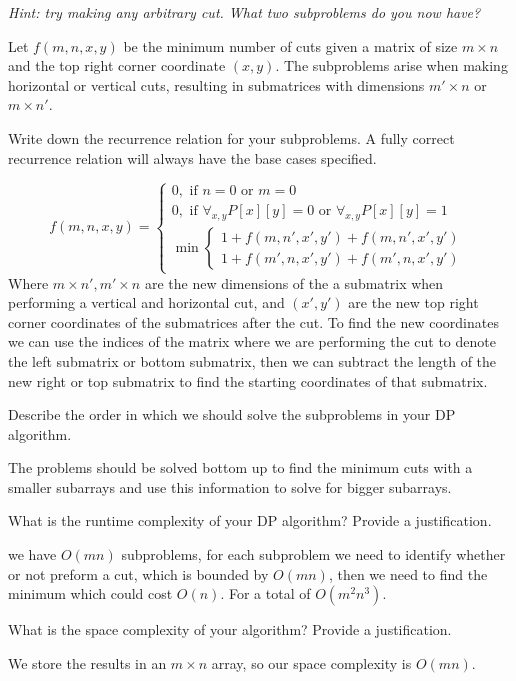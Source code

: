 \documentclass[11pt]{article}
\begin{document}
\begin{subparts}
    \emph{Hint: try making any arbitrary cut. What two subproblems do you now have?}\\
    \begin{solution}
 Let $f(m, n, x, y)$ be the minimum number of cuts given a matrix of size $m \times n$ and the top right corner coordinate $(x, y)$. The subproblems arise when making horizontal or vertical cuts, resulting in submatrices with dimensions $m' \times n$ or $m \times n'$.     \end{solution}
    \subpart Write down the recurrence relation for your subproblems. A fully correct recurrence relation will always have the base cases specified.\\
    \begin{solution}
        $$
        f(m,n, x, y)=
        \begin{cases}
        0, \text{ if $n = 0$ or $m=0$}\\
        0, \text{ if $\forall_{x, y} P[x][y] = 0$ or $\forall_{x, y}P[x][y] = 1$}\\
        \min \begin{cases} 1 + f(m, n', x', y') + f(m, n', x', y') \\ 1 + f(m', n, x', y') + f(m', n, x', y')\end{cases}
        \end{cases}
        $$
        Where $m \times n', m' \times n$ are the new dimensions of the a submatrix when performing a vertical and horizontal cut, and $(x', y')$ are the new top right corner coordinates
        of the submatrices after the cut. To find the new coordinates we can use the indices of the matrix where we are performing the cut to denote the left submatrix or bottom submatrix, then 
        we can subtract the length of the new right or top submatrix to find the starting coordinates of that submatrix.
    \end{solution}
    \subpart Describe the order in which we should solve the subproblems in your DP algorithm.
    \begin{solution}
        The problems should be solved bottom up to find the minimum cuts with a smaller subarrays and use this information to 
        solve for bigger subarrays.
    \end{solution}
\subpart What is the runtime complexity of your DP algorithm? Provide a justification.\\
\begin{solution}
    we have $O(mn)$ subproblems, for each subproblem we need to identify whether or not preform a cut, which is bounded by $O(mn)$, then we need to find the minimum 
    which could cost $O(n)$. For a total of $O(m^2n^3)$. 
\end{solution}
\subpart What is the space complexity of your algorithm? Provide a justification.\\
\begin{solution}
    We store the results in an $m \times n$ array, so our space complexity is $O(mn)$.
\end{solution}
\end{subparts}
\end{document}
